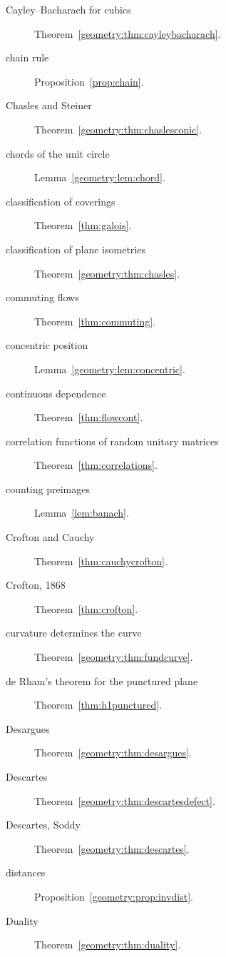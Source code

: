 \begin{description}
\item[Cayley--Bacharach for cubics] Theorem~\ref{geometry:thm:cayleybacharach}.
\item[chain rule] Proposition~\ref{prop:chain}.
\item[Chasles and Steiner] Theorem~\ref{geometry:thm:chaslesconic}.
\item[chords of the unit circle] Lemma~\ref{geometry:lem:chord}.
\item[classification of coverings] Theorem~\ref{thm:galois}.
\item[classification of plane isometries] Theorem~\ref{geometry:thm:chasles}.
\item[commuting flows] Theorem~\ref{thm:commuting}.
\item[concentric position] Lemma~\ref{geometry:lem:concentric}.
\item[continuous dependence] Theorem~\ref{thm:flowcont}.
\item[correlation functions of random unitary matrices] Theorem~\ref{thm:correlations}.
\item[counting preimages] Lemma~\ref{lem:banach}.
\item[Crofton and Cauchy] Theorem~\ref{thm:cauchycrofton}.
\item[Crofton, 1868] Theorem~\ref{thm:crofton}.
\item[curvature determines the curve] Theorem~\ref{geometry:thm:fundcurve}.
\item[de Rham's theorem for the punctured plane] Theorem~\ref{thm:h1punctured}.
\item[Desargues] Theorem~\ref{geometry:thm:desargues}.
\item[Descartes] Theorem~\ref{geometry:thm:descartesdefect}.
\item[Descartes, Soddy] Theorem~\ref{geometry:thm:descartes}.
\item[distances] Proposition~\ref{geometry:prop:invdist}.
\item[Duality] Theorem~\ref{geometry:thm:duality}.

\end{description}
